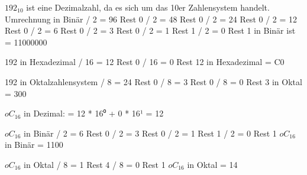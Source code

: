 \documentclass[a4paper,11pt,titlepage]{article}
\begin{document}
$192_10$ ist eine Dezimalzahl, da es sich um das 10er Zahlensystem handelt.\newline
Umrechnung in Bin\"ar  / 2 = 96 Rest 0  / 2 = 48 Rest 0  / 2 = 24 Rest 0  / 2 = 12 Rest 0  / 2 =  6 Rest 0  / 2 =  3 Rest 0  / 2 =  1 Rest 1  / 2 =  0 Rest 1  in Bin\"ar ist = 11000000 \newline

192 in Hexadezimal  / 16 = 12 Rest 0  / 16 =  0 Rest 12  in Hexadezimal = C0 \newline

192 in Oktalzahlensystem  / 8 = 24 Rest 0  / 8 =  3 Rest 0  / 8 =  0 Rest 3  in Oktal = 300 \newline



$oC_16$ in Dezimal: \newline
= 12 * 16⁰ + 0 * 16¹ \newline
= 12 \newline

$oC_16$ in Bin\"ar  / 2 = 6 Rest 0  / 2 = 3 Rest 0  / 2 = 1 Rest 1  / 2 = 0 Rest 1 \newline
$oC_16$ in Bin\"ar = 1100

$oC_16$ in Oktal  / 8 = 1 Rest 4 / 8 = 0 Rest 1\newline
$oC_16$ in Oktal = 14 \newline
\end{document}
